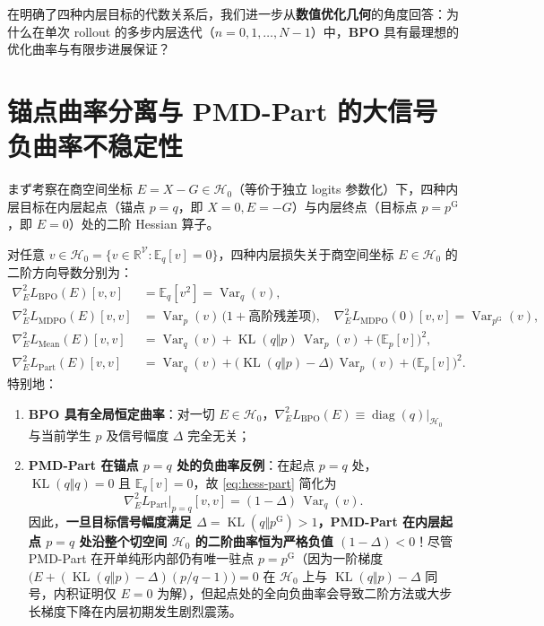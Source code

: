 \documentclass[lang=cn,scheme=chinese,openany]{../book/elegantbook}
\newcommand{\E}{\mathbb E}
\newcommand{\KL}{\operatorname{KL}}
\newcommand{\Var}{\operatorname{Var}}
\newcommand{\R}{\mathbb R}
\begin{document}
在明确了四种内层目标的代数关系后，我们进一步从\textbf{数值优化几何}的角度回答：为什么在单次 rollout 的多步内层迭代（$n=0,1,\dots,N-1$）中，\textbf{BPO} 具有最理想的优化曲率与有限步进展保证？

\section{锚点曲率分离与 PMD-Part 的大信号负曲率不稳定性}
\label{sec:anchor-curvature}

まず考察在商空间坐标 $E=X-G\in\mathcal H_0$（等价于独立 logits 参数化）下，四种内层目标在内层起点（锚点 $p=q$，即 $X=0, E=-G$）与内层终点（目标点 $p=p^{\mathrm G}$，即 $E=0$）处的二阶 Hessian 算子。

\begin{proposition}[四种内层目标的商空间曲率与锚点曲率分离]
\label{prop:geometry-anchor}
\label{prop:geometry-part-stationary}
对任意 $v\in\mathcal H_0=\{v\in\R^{\mathcal V}:\E_q[v]=0\}$，四种内层损失关于商空间坐标 $E\in\mathcal H_0$ 的二阶方向导数分别为：
\begin{align}
 \nabla^2_E L_{\mathrm{BPO}}(E)[v,v] &= \E_q[v^2] = \Var_q(v), \label{eq:hess-bpo}\\
 \nabla^2_E L_{\mathrm{MDPO}}(E)[v,v] &= \Var_p(v)\,\bigl(1+\text{高阶残差项}\bigr),\quad \nabla^2_E L_{\mathrm{MDPO}}(0)[v,v]=\Var_{p^{\mathrm G}}(v), \label{eq:hess-mdpo}\\
 \nabla^2_E L_{\mathrm{Mean}}(E)[v,v] &= \Var_q(v)+\KL(q\Vert p)\,\Var_p(v)+\bigl(\E_p[v]\bigr)^2, \label{eq:hess-mean}\\
 \nabla^2_E L_{\mathrm{Part}}(E)[v,v] &= \Var_q(v)+\bigl(\KL(q\Vert p)-\Delta\bigr)\,\Var_p(v)+\bigl(\E_p[v]\bigr)^2. \label{eq:hess-part}
\end{align}
特别地：
\begin{enumerate}
 \item \textbf{BPO 具有全局恒定曲率}：对一切 $E\in\mathcal H_0$，$\nabla^2_E L_{\mathrm{BPO}}(E)\equiv \operatorname{diag}(q)|_{\mathcal H_0}$ 与当前学生 $p$ 及信号幅度 $\Delta$ 完全无关；
 \item \textbf{PMD-Part 在锚点 $p=q$ 处的负曲率反例}：在起点 $p=q$ 处，$\KL(q\Vert q)=0$ 且 $\E_q[v]=0$，故 \cref{eq:hess-part} 简化为
 \begin{equation}
  \nabla^2_E L_{\mathrm{Part}}\big|_{p=q}[v,v] = (1-\Delta)\,\Var_q(v).
  \label{eq:part-anchor-curvature}
 \end{equation}
 因此，\textbf{一旦目标信号幅度满足 $\Delta=\KL(q\Vert p^{\mathrm G})>1$，PMD-Part 在内层起点 $p=q$ 处沿整个切空间 $\mathcal H_0$ 的二阶曲率恒为严格负值 $(1-\Delta)<0$}！尽管 PMD-Part 在开单纯形内部仍有唯一驻点 $p=p^{\mathrm G}$（因为一阶梯度 $\bigl(E+(\KL(q\Vert p)-\Delta)(p/q-1)\bigr)=0$ 在 $\mathcal H_0$ 上与 $\KL(q\Vert p)-\Delta$ 同号，内积证明仅 $E=0$ 为解），但起点处的全向负曲率会导致二阶方法或大步长梯度下降在内层初期发生剧烈震荡。
\end{enumerate}
\end{proposition}
\end{document}
